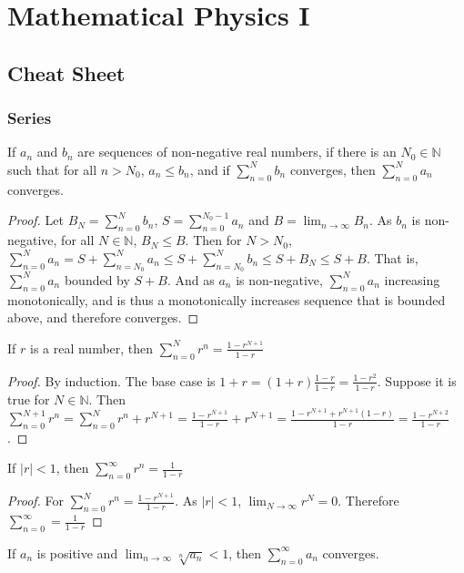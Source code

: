 \documentclass[crop=false,class=book]{standalone}
\begin{document}
\chapter{Mathematical Physics I}
\section{Cheat Sheet}
\subsection{Series}
\begin{theorem*}
If $a_n$ and $b_n$ are sequences of non-negative real numbers, if there is an $N_0\in \mathbb{N}$ such that for all $n>N_0$, $a_n\leq b_n$, and if $\sum_{n=0}^{N}b_n$ converges, then $\sum_{n=0}^{N}a_n$ converges.
\end{theorem*}
\begin{proof}
Let $B_N=\sum_{n=0}^{N}b_n$, $S = \sum_{n=0}^{N_{0}-1}a_n$ and $B=\lim_{n\rightarrow \infty}B_{n}$. As $b_n$ is non-negative, for all $N\in \mathbb{N}$, $B_{N} \leq B$. Then for $N>N_{0}$, $\sum_{n=0}^{N}a_n = S+\sum_{n=N_{0}}^{N}a_n \leq S+\sum_{n=N_{0}}^{N}b_n \leq S+B_{N} \leq S+B$. That is, $\sum_{n=0}^{N}a_n$ bounded by $S+B$. And as $a_n$ is non-negative, $\sum_{n=0}^{N}a_n$ increasing monotonically, and is thus a monotonically increases sequence that is bounded above, and therefore converges.
\end{proof}
\begin{theorem*}
If $r$ is a real number, then $\sum_{n=0}^{N} r^n = \frac{1-r^{N+1}}{1-r}$
\end{theorem*}
\begin{proof}
By induction. The base case is $1+r = (1+r)\frac{1-r}{1-r} = \frac{1-r^2}{1-r}$. Suppose it is true for $N \in \mathbb{N}$. Then $\sum_{n=0}^{N+1}r^n=\sum_{n=0}^{N}r^n+r^{N+1}= \frac{1-r^{N+1}}{1-r}+r^{N+1}=\frac{1-r^{N+1}+r^{N+1}(1-r)}{1-r}=\frac{1-r^{N+2}}{1-r}$.
\end{proof}
\begin{theorem}
If $|r|<1$, then $\sum_{n=0}^{\infty} r^n = \frac{1}{1-r}$
\end{theorem}
\begin{proof}
For $\sum_{n=0}^{N}r^{n}=\frac{1-r^{N+1}}{1-r}$. As $|r|<1$, $\lim_{N\rightarrow \infty}r^{N}=0$. Therefore $\sum_{n=0}^{\infty}=\frac{1}{1-r}$
\end{proof}
\begin{theorem*}
If $a_n$ is positive and $\lim_{n\rightarrow \infty} \sqrt[n]{a_n}<1$, then $\sum_{n=0}^{\infty} a_n$ converges.
\end{theorem*}
\end{document}
